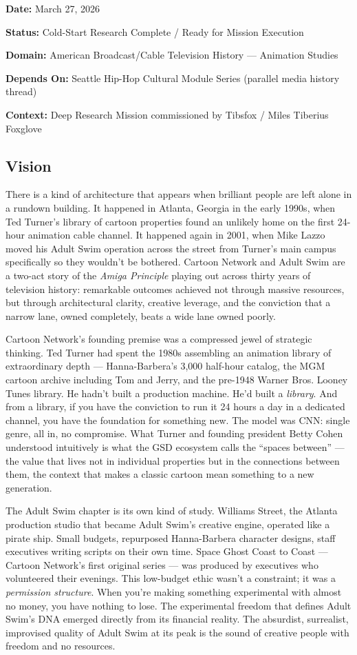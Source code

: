 \documentclass[11pt,letterpaper]{article}
\newcommand{\metafield}[2]{\textbf{\sffamily #1} #2\par}
\begin{document}
\metafield{Date:}{March 27, 2026}
\metafield{Status:}{Cold-Start Research Complete / Ready for Mission Execution}
\metafield{Domain:}{American Broadcast/Cable Television History --- Animation Studies}
\metafield{Depends On:}{Seattle Hip-Hop Cultural Module Series (parallel media history thread)}
\metafield{Context:}{Deep Research Mission commissioned by Tibsfox / Miles Tiberius Foxglove}

\subsection{Vision}

There is a kind of architecture that appears when brilliant people are left alone in a rundown building. It happened in Atlanta, Georgia in the early 1990s, when Ted Turner's library of cartoon properties found an unlikely home on the first 24-hour animation cable channel. It happened again in 2001, when Mike Lazzo moved his Adult Swim operation across the street from Turner's main campus specifically so they wouldn't be bothered. Cartoon Network and Adult Swim are a two-act story of the \emph{Amiga Principle} playing out across thirty years of television history: remarkable outcomes achieved not through massive resources, but through architectural clarity, creative leverage, and the conviction that a narrow lane, owned completely, beats a wide lane owned poorly.

Cartoon Network's founding premise was a compressed jewel of strategic thinking. Ted Turner had spent the 1980s assembling an animation library of extraordinary depth --- Hanna-Barbera's 3,000 half-hour catalog, the MGM cartoon archive including Tom and Jerry, and the pre-1948 Warner Bros. Looney Tunes library. He hadn't built a production machine. He'd built a \emph{library}. And from a library, if you have the conviction to run it 24 hours a day in a dedicated channel, you have the foundation for something new. The model was CNN: single genre, all in, no compromise. What Turner and founding president Betty Cohen understood intuitively is what the GSD ecosystem calls the ``spaces between'' --- the value that lives not in individual properties but in the connections between them, the context that makes a classic cartoon mean something to a new generation.

The Adult Swim chapter is its own kind of study. Williams Street, the Atlanta production studio that became Adult Swim's creative engine, operated like a pirate ship. Small budgets, repurposed Hanna-Barbera character designs, staff executives writing scripts on their own time. Space Ghost Coast to Coast --- Cartoon Network's first original series --- was produced by executives who volunteered their evenings. This low-budget ethic wasn't a constraint; it was a \emph{permission structure}. When you're making something experimental with almost no money, you have nothing to lose. The experimental freedom that defines Adult Swim's DNA emerged directly from its financial reality. The absurdist, surrealist, improvised quality of Adult Swim at its peak is the sound of creative people with freedom and no resources.
\end{document}
